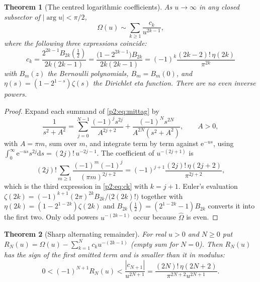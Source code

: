 \documentclass[11pt,a4paper,oneside]{book}
\theoremstyle{plain}
\newtheorem{theorem}{Theorem}[chapter]
\theoremstyle{definition}
\theoremstyle{remark}
\newcommand{\e}{\mathrm{e}}
\newcommand{\dd}{\mathrm{d}}
\begin{document}
\begin{theorem}[The centred logarithmic coefficients]
\label{p2:thm:coefficients}
As \(u\to\infty\) in any closed subsector of \(|\arg u|<\pi/2\),
\begin{equation}
 \Omega(u)\sim\sum_{k\ge1}\frac{c_k}{u^{2k-1}},
 \label{p2:eq:Omega-series}
\end{equation}
where the following three expressions coincide:
\begin{equation}
 \boxed{\;
 c_k=\frac{2^{2k-1}B_{2k}\!\left(\tfrac12\right)}{2k(2k-1)}
 =\frac{\bigl(1-2^{2k-1}\bigr)B_{2k}}{2k(2k-1)}
 =(-1)^k\frac{(2k-2)!\,\eta(2k)}{\pi^{2k}} \;}
 \label{p2:eq:ck}
\end{equation}
with \(B_m(z)\) the Bernoulli polynomials, \(B_m=B_m(0)\), and
\(\eta(s)=(1-2^{1-s})\zeta(s)\) the Dirichlet eta function.  There are no even
inverse powers.
\end{theorem}

\begin{proof}
Expand each summand of \cref{p2:eq:mittag} by
\begin{equation}
 \frac1{s^2+A^2}
 =\sum_{j=0}^{N-1}\frac{(-1)^js^{2j}}{A^{2j+2}}
 +\frac{(-1)^Ns^{2N}}{A^{2N}(s^2+A^2)},
 \qquad A>0,
 \label{p2:eq:partial-fraction-remainder}
\end{equation}
with \(A=\pi m\), sum over \(m\), and integrate term by term against
\(\e^{-us}\), using \(\int_0^\infty\e^{-us}s^{2j}\dd s=(2j)!\,u^{-2j-1}\).
The coefficient of \(u^{-(2j+1)}\) is
\[
 (2j)!\sum_{m\ge1}\frac{(-1)^m(-1)^j}{(\pi m)^{2j+2}}
 =(-1)^{j+1}\frac{(2j)!\,\eta(2j+2)}{\pi^{2j+2}},
\]
which is the third expression in \cref{p2:eq:ck} with \(k=j+1\).  Euler's
evaluation \(\zeta(2k)=(-1)^{k+1}(2\pi)^{2k}B_{2k}/\bigl(2(2k)!\bigr)\)
together with \(\eta(2k)=(1-2^{1-2k})\zeta(2k)\) and
\(B_{2k}(\tfrac12)=(2^{1-2k}-1)B_{2k}\) converts it into the first two.  Only
odd powers \(u^{-(2k-1)}\) occur because \(\widehat\Omega\) is even.
\end{proof}

\begin{theorem}[Sharp alternating remainder]
\label{p2:thm:remainder}
For real \(u>0\) and \(N\ge0\) put
\(R_N(u)=\Omega(u)-\sum_{k=1}^N c_ku^{-(2k-1)}\) (empty sum for \(N=0\)).
Then \(R_N(u)\) has the sign of the first omitted term and is smaller than it
in modulus:
\begin{equation}
 0<(-1)^{N+1}R_N(u)<\frac{|c_{N+1}|}{u^{2N+1}}
 =\frac{(2N)!\,\eta(2N+2)}{\pi^{2N+2}u^{2N+1}} .
 \label{p2:eq:remainder}
\end{equation}
\end{theorem}
\end{document}
